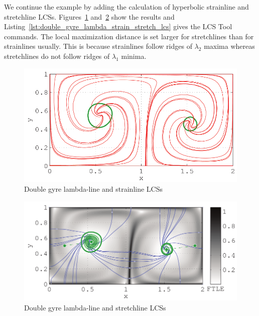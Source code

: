 \documentclass{article}
\begin{document}
We continue the example by adding the calculation of hyperbolic strainline and stretchline LCSs. Figures~\ref{fig:double_gyre_lambda_strain_lcs} and~\ref{fig:double_gyre_lambda_stretch_lcs} show the results and Listing~\ref{lst:double_gyre_lambda_strain_stretch_lcs} gives the LCS Tool commands. The local maximization distance is set larger for stretchlines than for strainlines usually. This is because strainlines follow ridges of $\lambda_2$ maxima whereas stretchlines do not follow ridges of $\lambda_1$ minima.

\begin{figure}
  \centering
  \includegraphics[width=\textwidth]{graphics/double_gyre/lambda_strain_lcs}
  \caption{Double gyre lambda-line and strainline LCSs}
  \label{fig:double_gyre_lambda_strain_lcs}
\end{figure}

\begin{figure}
  \centering
  \includegraphics[width=\textwidth]{graphics/double_gyre/lambda_stretch_lcs}
  \caption{Double gyre lambda-line and stretchline LCSs}
  \label{fig:double_gyre_lambda_stretch_lcs}
\end{figure}


\end{document}
